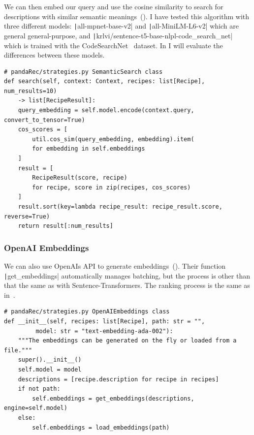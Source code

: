 \documentclass[
     12pt,                    %
     a4paper,             %
     BCOR=10mm,     %
     DIV=14,                 %
     listof=totoc,                    %
     bibliography=totoc,       %
     index=totoc,              %
     twoside,
     headsepline
     ]{scrreprt}
\begin{document}
\clearpage

We can then embed our query and use the cosine similarity to search for descriptions with similar semantic meanings~(). I have tested this algorithm with three different models: \texttt|all-mpnet-base-v2| and \texttt|all-MiniLM-L6-v2| which are general general-purpose, and \texttt|krlvi/sentence-t5-base-nlpl-code_search_net| which is trained with the CodeSearchNet~\cite{husain2019codesearchnet} dataset. In  I will evaluate the differences between these models.

\begin{listing}[htb]
	\begin{verbatim}
# pandaRec/strategies.py SemanticSearch class
def search(self, context: Context, recipes: list[Recipe], num_results=10)
	-> list[RecipeResult]:
	query_embedding = self.model.encode(context.query, convert_to_tensor=True)
	cos_scores = [
		util.cos_sim(query_embedding, embedding).item(
		for embedding in self.embeddings
	]
	result = [
		RecipeResult(score, recipe)
		for recipe, score in zip(recipes, cos_scores)
	]
	result.sort(key=lambda recipe_result: recipe_result.score, reverse=True)
	return result[:num_results]
	\end{verbatim}
	\caption[Searching the Embeddings]{Searching the Embeddings.\label{list:searchembed}}
\end{listing}
	
\subsubsection{OpenAI Embeddings}

We can also use OpenAIs API to generate embeddings~(). Their function \texttt|get_embeddings| automatically manages batching, but the process is other than that the same as with Sentence-Transformers. The ranking process is the same as in~.


\begin{listing}[htb]
	\begin{verbatim}
# pandaRec/strategies.py OpenAIEmbeddings class
def __init__(self, recipes: list[Recipe], path: str = "",
		 model: str = "text-embedding-ada-002"):
	"""The embeddings can be generated on the fly or loaded from a file."""
	super().__init__()
	self.model = model
	descriptions = [recipe.description for recipe in recipes]
	if not path:
		self.embeddings = get_embeddings(descriptions, engine=self.model)
	else:
		self.embeddings = load_embeddings(path)
\end{verbatim}
\caption[OpenAI embeddings]{OpenAI embeddings.\label{list:openaiembed}}
\end{listing}
\end{document}
